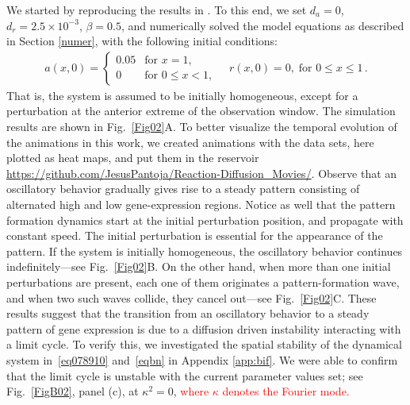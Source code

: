 \documentclass[%
 preprint,
 aip, 
 amsmath,amssymb,
]{revtex4-2}
\begin{document}
	We started by reproducing the results in \cite{Cotterell2015}. To this end, we
	set $d_a=0$, $d_r = 2.5\times10^{-3}$, $\beta = 0.5$, and numerically solved the
	model equations as described in Section \ref{numer}, with the following initial 
	conditions:
	\begin{gather}
	a(x, 0) = \left\{\begin{array}{cl}
	0.05 & \text{for } x = 1, \\
	0 & \text{for } 0 \leq x < 1,
	\end{array} \right. 
	\quad
	r(x, 0) = 0, \; \text{for } 0 \leq x \leq 1\,.
	\end{gather}
	That is, the system is assumed to be initially homogeneous, except for a
	perturbation at the anterior extreme of the observation window.	
	The simulation results are shown in Fig.~\ref{Fig02}A. To better visualize 
	the temporal evolution of the animations in this work, we created 
	animations with the data sets, here plotted as heat maps, and put them 
	in the reservoir 
	\url{https://github.com/JesusPantoja/Reaction-Diffusion_Movies/}. 
	Observe that an oscillatory behavior
	gradually gives rise to a steady pattern consisting of alternated high and low
	gene-expression regions. Notice as well that the pattern formation dynamics start at
	the initial perturbation position, and propagate with constant speed. The
	initial perturbation is essential for the appearance of the pattern. If the
	system is initially homogeneous, the oscillatory behavior continues
	indefinitely---see Fig.~\ref{Fig02}B. On the other hand, when more than one
	initial perturbations are present, each one of them originates a
	pattern-formation wave, and when two such waves collide, they cancel out---see 
	Fig.~\ref{Fig02}C. These results suggest that the transition from an
	oscillatory behavior to a steady pattern of gene expression is due to a
	diffusion driven instability interacting with a limit cycle. To verify this,
	we investigated the spatial stability of the dynamical system
	in~\eqref{eq078910} and~\eqref{eqbn} in
	Appendix \ref{app:bif}. We were able to confirm
	that the limit cycle is unstable with the current parameter values set; see
	Fig.~\ref{FigB02}, panel (c), at $\kappa^2=0$, 
	\textcolor{red}{where $\kappa$ denotes the Fourier mode.}
	
\end{document}
